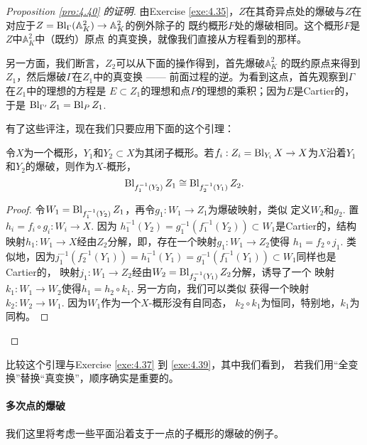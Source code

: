 \begin{proof}[Proposition \ref{pro:4.40} 的证明]
由Exercise \ref{exe:4.35}，$Z$在其奇异点处的爆破与$Z$在
对应于$Z=\operatorname{Bl}_\Gamma (\mathbb A_K^2)\to \mathbb A_K^2$的例外除子的
既约概形$F$处的爆破相同。这个概形$F$是$Z$中$\mathbb A_K^2$中（既约）原点
的真变换，就像我们直接从方程看到的那样。

另一方面，我们断言，$Z_2$可以从下面的操作得到，首先爆破$\mathbb A_K^2$
的既约原点来得到$Z_1$，然后爆破$\Gamma$在$Z_1$中的真变换 ------
前面过程的逆。\nottran 为看到这点，首先观察到$\Gamma$在$Z_1$中的理想的方程是
$E\subset Z_1$的理想和点$P$的理想的乘积；因为$E$是Cartier的，于是
$\operatorname{Bl}_{\Gamma'}Z_1=\operatorname{Bl}_P Z_1$.

有了这些评注，现在我们只要应用下面的这个引理：

\begin{lem}\label{lem:4.41}
	令$X$为一个概形，$Y_1$和$Y_2\subset X$为其闭子概形。若$f_i:Z_i=\operatorname{Bl}_{Y_i}X\to X$为$X$沿着$Y_1$和$Y_2$的爆破，则作为$X$-概形，
	\[
		\operatorname{Bl}_{f_1^{-1}(Y_2)}Z_1 \cong \operatorname{Bl}_{f_2^{-1}(Y_1)}Z_2.
	\]
\end{lem}

\begin{proof}
令$W_1=\operatorname{Bl}_{f_1^{-1}(Y_2)}Z_1$，再令$g_1:W_1\to Z_1$为爆破映射，类似
定义$W_2$和$g_2$. 置$h_i=f_i\circ g_i:W_i\to X$. 因为
$h_1^{-1}(Y_2)=g_1^{-1}(f_1^{-1}(Y_2))\subset W_1$是Cartier的，结构
映射$h_1:W_1\to X$经由$Z_2$分解，即，存在一个映射$g_1:W_1\to Z_2$使得
$h_1=f_2\circ j_1$. 类似地，因为$j_1^{-1}(f_2^{-1}(Y_1))=
h_1^{-1}(Y_1)=g_1^{-1}(f_1^{-1}(Y_1))\subset W_1$同样也是Cartier的，
映射$j_1:W_1\to Z_2$经由$W_2=\operatorname{Bl}_{f_2^{-1}(Y_1)}Z_2$分解，诱导了一个
映射$k_1:W_1\to W_2$使得$h_1=h_2\circ k_1$. 另一方向，我们可以类似
获得一个映射$k_2:W_2\to W_1$. 因为$W_1$作为一个$X$-概形没有自同态，
$k_2\circ k_1$为恒同，特别地，$k_1$为同构。
\renewcommand{\qedsymbol}{}
\end{proof}

\renewcommand{\qedsymbol}{$\square\hspace{-1.9ex}\square$}
\end{proof}\renewcommand{\qedsymbol}{$\square$}

比较这个引理与Exercise \ref{exe:4.37} 到 \ref{exe:4.39}，其中我们看到，
若我们用“全变换”替换“真变换”，顺序确实是重要的。

\paragraph*{多次点的爆破}
我们这里将考虑一些平面沿着支于一点的子概形的爆破的例子。

